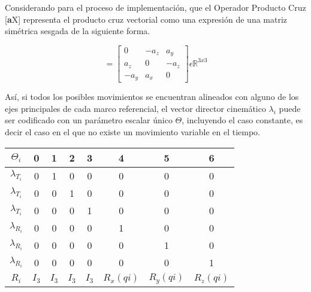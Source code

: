         Considerando para el proceso de implementación, que el Operador Producto Cruz 
        [\textbf{a}X] representa el producto cruz vectorial como una expresión 
        de una matriz simétrica sesgada de la siguiente forma.

        \begin{equation*}
            [\mathbf{a}\times] = 
            \begin{bmatrix}
                0 & -a_z & a_y\\
                a_z & 0 & -a_z\\
                -a_y & a_x & 0
            \end{bmatrix}
            \epsilon \mathbb{R}^{3x3}
        \end{equation*}

        Así, si todos los posibles movimientos se encuentran alineados con alguno de los 
        ejes principales de cada marco referencial, el vector director cinemático $\lambda_i$ 
        puede ser codificado con un parámetro escalar único $\Theta$, incluyendo el caso constante, 
        es decir el caso en el que no existe un movimiento variable en el tiempo.

        \begin{table}[H]
            \centering
                \begin{center}
                    \begin{tabular}{cccccccc}
                        $\Theta_i$ & 0 & 1 & 2 & 3 & 4 & 5 & 6\\
                        \hline \hline 
                        $\lambda_{T_i}$ & 0 & 1 & 0 & 0 & 0 & 0 & 0\\ 
                        $\lambda_{T_i}$ & 0 & 0 & 1 & 0 & 0 & 0 & 0\\
                        $\lambda_{T_i}$ & 0 & 0 & 0 & 1 & 0 & 0 & 0\\
                        \hline 
                        $\lambda_{R_i}$ & 0 & 0 & 0 & 0 & 1 & 0 & 0\\
                        $\lambda_{R_i}$ & 0 & 0 & 0 & 0 & 0 & 1 & 0\\
                        $\lambda_{R_i}$ & 0 & 0 & 0 & 0 & 0 & 0 & 1\\
                        \hline 
                        $R_{i}$ & $I_3$ & $I_3$ & $I_3$ & $I_3$ & $R_{x}(qi)$ & $R_{y}(qi)$ & $R_{z}(qi)$\\
                    \end{tabular}
                \end{center}
        \end{table}

